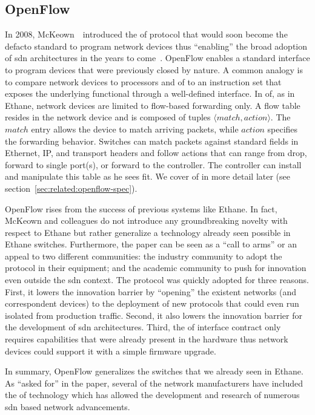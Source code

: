 \subsection{OpenFlow}
\label{sec:related:openflow}
In 2008, McKeown~\etal\ introduced the \gls{of} protocol that would soon become the defacto  standard to program network devices thus ``enabling'' the broad adoption of \gls{sdn} architectures in the years to come~\cite{McKeown:2008dn}. 
OpenFlow  enables a standard interface to program devices that were previously closed by nature. 
A common analogy is to compare network devices to processors and \gls{of} to an instruction set that exposes the underlying functional through a well-defined interface. 
In \gls{of}, as in Ethane, network devices are limited to flow-based forwarding only. 
A flow table resides in the network device and is composed of tuples $\langle match,action \rangle$. 
The $match$ entry allows the device to match arriving packets, while  $action$ specifies the forwarding behavior. 
Switches can match packets against standard fields in Ethernet, IP, and transport headers and follow actions that can range from drop, forward to single port(s), or forward to the controller. 
The controller can install and manipulate this table as he sees fit. 
We cover \gls{of} in more detail later (see section~\ref{sec:related:openflow-spec}). 

OpenFlow rises from the success of previous systems like Ethane.
In fact, McKeown and colleagues do not introduce any groundbreaking novelty with respect to Ethane but rather generalize a technology already seen possible in Ethane switches. 
Furthermore, the paper can be seen as a ``call to arms'' or an appeal to two different communities: the industry community to adopt the protocol in their equipment; and the academic community to push for innovation even outside the \gls{sdn} context. 
The protocol  was quickly adopted for three reasons. 
First, it lowers the innovation barrier by ``opening''  the existent networks (and correspondent devices) to the deployment of new protocols that could even run isolated from production traffic. 
Second, it also lowers the innovation barrier for the development of \gls{sdn} architectures. 
Third, the \gls{of} interface contract only requires capabilities that were already present in the hardware thus network devices could support it with a simple firmware upgrade. 

In summary,  OpenFlow generalizes the switches that we already seen in Ethane. 
As ``asked for'' in the paper, several of the  network manufacturers have included the \gls{of} technology which has allowed the development and research of numerous \gls{sdn} based network advancements. 

